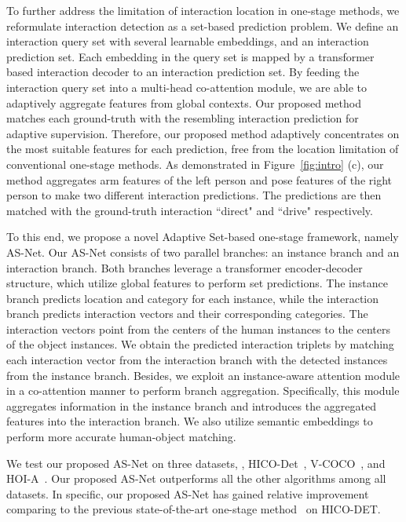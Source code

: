 \documentclass[final]{cvpr}
\begin{document}
To further address the limitation of interaction location in one-stage methods, we reformulate interaction detection as a set-based prediction problem. We define an interaction query set with several learnable embeddings, and an interaction prediction set. Each embedding in the query set is mapped by a transformer based interaction decoder to an interaction prediction set. By feeding the interaction query set into a multi-head co-attention module, we are able to adaptively aggregate features from global contexts. Our proposed method matches each ground-truth with the resembling interaction prediction for adaptive supervision. Therefore, our proposed method adaptively concentrates on the most suitable features for each prediction, free from the location limitation of conventional one-stage methods. As demonstrated in Figure~\ref{fig:intro} (c), our method aggregates arm features of the left person and pose features of the right person to make two different interaction predictions. The predictions are then matched with the ground-truth interaction ``direct" and ``drive" respectively.

To this end, we propose a novel Adaptive Set-based one-stage framework, namely AS-Net. Our AS-Net consists of two parallel branches: an instance branch and an interaction branch. Both branches leverage a transformer encoder-decoder structure, which utilize global features to perform set predictions. The instance branch predicts location and category for each instance, while the interaction branch predicts interaction vectors and their corresponding categories. The interaction vectors point from the centers of the human instances to the centers of the object instances. We obtain the predicted interaction triplets by matching each interaction vector from the interaction branch with the detected instances from the instance branch. Besides, we exploit an instance-aware attention module in a co-attention manner to perform branch aggregation. Specifically, this module aggregates information in the instance branch and introduces the aggregated features into the interaction branch. We also utilize semantic embeddings to perform more accurate human-object matching.

We test our proposed AS-Net on three datasets, \ie, HICO-Det~\cite{qi2018learning}, V-COCO~\cite{gupta2015visual}, and HOI-A~\cite{liao2020ppdm}. Our proposed AS-Net outperforms all the other algorithms among all datasets. In specific, our proposed AS-Net has gained  relative improvement comparing to the previous state-of-the-art one-stage method~\cite{liao2020ppdm} on HICO-DET.
\end{document}
